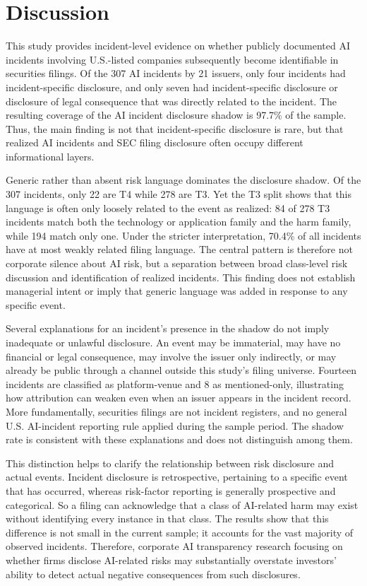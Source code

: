 \documentclass[utf8]{FrontiersinHarvard}
\begin{document}
\section{Discussion}

This study provides incident-level evidence on whether publicly documented AI incidents involving U.S.-listed companies subsequently become identifiable in securities filings. Of the 307 AI incidents by 21 issuers, only four incidents had incident-specific disclosure, and only seven had incident-specific disclosure or disclosure of legal consequence that was directly related to the incident. The resulting coverage of the AI incident disclosure shadow is 97.7\% of the sample. Thus, the main finding is not that incident-specific disclosure is rare, but that realized AI incidents and SEC filing disclosure often occupy different informational layers.

Generic rather than absent risk language dominates the disclosure shadow. Of the 307 incidents, only 22 are T4 while 278 are T3. Yet the T3 split shows that this language is often only loosely related to the event as realized: 84 of 278 T3 incidents match both the technology or application family and the harm family, while 194 match only one. Under the stricter interpretation, 70.4\% of all incidents have at most weakly related filing language. The central pattern is therefore not corporate silence about AI risk, but a separation between broad class-level risk discussion and identification of realized incidents. This finding does not establish managerial intent or imply that generic language was added in response to any specific event.

Several explanations for an incident's presence in the shadow do not imply inadequate or unlawful disclosure. An event may be immaterial, may have no financial or legal consequence, may involve the issuer only indirectly, or may already be public through a channel outside this study's filing universe. Fourteen incidents are classified as platform-venue and 8 as mentioned-only, illustrating how attribution can weaken even when an issuer appears in the incident record. More fundamentally, securities filings are not incident registers, and no general U.S. AI-incident reporting rule applied during the sample period. The shadow rate is consistent with these explanations and does not distinguish among them.

This distinction helps to clarify the relationship between risk disclosure and actual events. Incident disclosure is retrospective, pertaining to a specific event that has occurred, whereas risk-factor reporting is generally prospective and categorical. So a filing can acknowledge that a class of AI-related harm may exist without identifying every instance in that class. The results show that this difference is not small in the current sample; it accounts for the vast majority of observed incidents. Therefore, corporate AI transparency research focusing on whether firms disclose AI-related risks may substantially overstate investors' ability to detect actual negative consequences from such disclosures.
\end{document}
